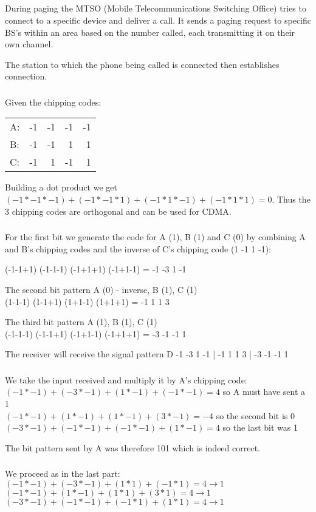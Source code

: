 \documentclass[12pt]{article}
\newcommand{\exercise}{\subsection{}\setcounter{subsubsection}{0}}
\newcommand{\multipartexercise}{\addtocounter{subsection}{1}\setcounter{subsubsection}{0}}
\newcommand{\exercisepart}{\subsubsection{}}
\begin{document}
\exercise
During paging the MTSO (Mobile Telecommunications Switching Office) tries to connect to a specific device and deliver a call. It sends a paging request to specific BS's within an area based on the number called, each transmitting it on their own channel.

The station to which the phone being called is connected then establishes connection.

\multipartexercise
\exercisepart
Given the chipping codes:\\
\begin{tabular}{lrrrr}
A:&-1&-1&-1&-1\\
B:&-1&-1&1&1\\
C:&-1&1&-1&1\\
\end{tabular}

Building a dot product we get $(-1*-1*-1)+(-1*-1*1)+(-1*1*-1)+(-1*1*1)=0$. Thus the 3 chipping codes are orthogonal and can be used for CDMA.

\exercisepart
For the first bit we generate the code for A (1), B (1) and C (0) by combining A and B's chipping codes and the inverse of C's chipping code (1 -1 1 -1):

\bigskip
\noindent
(-1-1+1) (-1-1-1) (-1+1+1) (-1+1-1) = -1 -3 1 -1

\bigskip
\noindent
The second bit pattern A (0) - inverse, B (1), C (1)\\
(1-1-1) (1-1+1) (1+1-1) (1+1+1) = -1 1 1 3

\bigskip
\noindent
The third bit pattern A (1), B (1), C (1)\\
(-1-1-1) (-1-1+1) (-1+1-1) (-1+1+1) = -3 -1 -1 1

\bigskip
\noindent
The receiver will receive the signal pattern D -1 -3 1 -1 | -1 1 1 3 | -3 -1 -1 1

\exercisepart
We take the input received and multiply it by A's chipping code:\\
$(-1*-1) + (-3*-1) + (1*-1) + (-1*-1) = 4$ so A must have sent a 1\\
$(-1*-1) + (1*-1) + (1*-1) + (3*-1) = -4$ so the second bit is 0\\
$(-3*-1) + (-1*-1) + (-1*-1) + (1*-1) = 4$ so the last bit was 1

\bigskip
\noindent
The bit pattern sent by A was therefore 101 which is indeed correct.

\exercisepart
We proceed as in the last part:\\
$(-1*-1) + (-3*-1) + (1*1) + (-1*1) = 4 \rightarrow 1$\\
$(-1*-1) + (1*-1) + (1*1) + (3*1) = 4 \rightarrow 1$\\
$(-3*-1) + (-1*-1) + (-1*1) + (1*1) = 4 \rightarrow 1$
\end{document}
